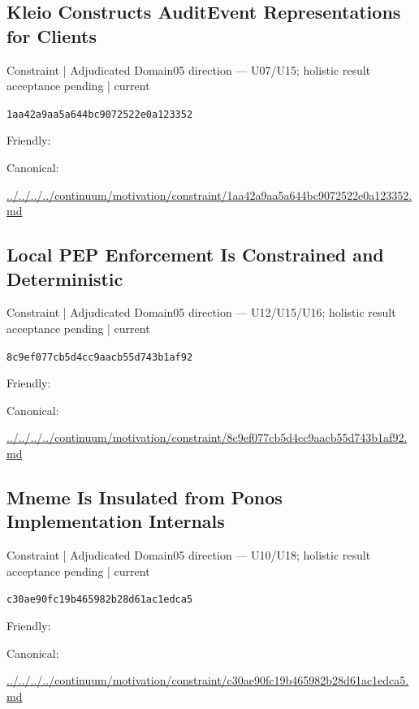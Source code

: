 \documentclass[10pt,a4paper]{article}
\begin{document}
\subsection*{Kleio Constructs AuditEvent Representations for Clients}
{\small Constraint | Adjudicated Domain05 direction — U07/U15; holistic result acceptance pending | current}\par
\texttt{1aa42a9aa5a644bc9072522e0a123352}\par
Friendly: \par
Canonical: \par
{\footnotesize\url{../../../../continuum/motivation/constraint/1aa42a9aa5a644bc9072522e0a123352.md}}\par
\subsection*{Local PEP Enforcement Is Constrained and Deterministic}
{\small Constraint | Adjudicated Domain05 direction — U12/U15/U16; holistic result acceptance pending | current}\par
\texttt{8c9ef077cb5d4cc9aacb55d743b1af92}\par
Friendly: \par
Canonical: \par
{\footnotesize\url{../../../../continuum/motivation/constraint/8c9ef077cb5d4cc9aacb55d743b1af92.md}}\par
\subsection*{Mneme Is Insulated from Ponos Implementation Internals}
{\small Constraint | Adjudicated Domain05 direction — U10/U18; holistic result acceptance pending | current}\par
\texttt{c30ae90fc19b465982b28d61ac1edca5}\par
Friendly: \par
Canonical: \par
{\footnotesize\url{../../../../continuum/motivation/constraint/c30ae90fc19b465982b28d61ac1edca5.md}}\par
\end{document}
